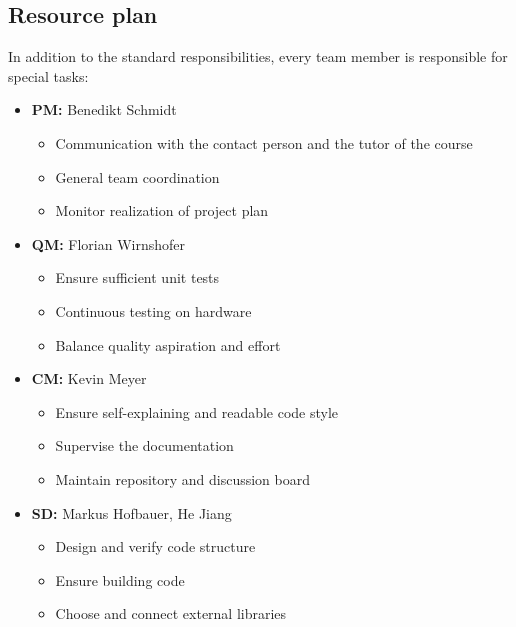 \documentclass[12pt]{article}
\begin{document}
\subsection{Resource plan}
In addition to the standard responsibilities, every team member is responsible for special tasks:
\begin{itemize}
	\item \textbf{PM:} Benedikt Schmidt
	\begin{itemize}
		\item Communication with the contact person and the tutor of the course
		\item General team coordination
		\item Monitor realization of project plan
	\end{itemize}
	 
	\item \textbf{QM:} Florian Wirnshofer
	\begin{itemize}
		\item Ensure sufficient unit tests
		\item Continuous testing on hardware
		\item Balance quality aspiration and effort
	\end{itemize}
	
	\item \textbf{CM:} Kevin Meyer
	\begin{itemize}
		\item Ensure self-explaining and readable code style
		\item Supervise the documentation
		\item Maintain repository and discussion board
	\end{itemize}
	
	\item \textbf{SD:} Markus Hofbauer, He Jiang 
	\begin{itemize}
		\item Design and verify code structure
		\item Ensure building code
		\item Choose and connect external libraries
	\end{itemize}
	
\end{itemize}
\end{document}

